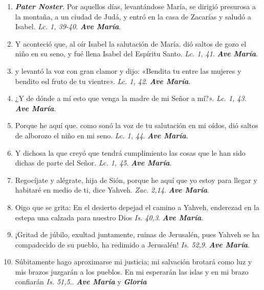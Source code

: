 \documentclass[../../devocionario.tex]{subfiles}
\begin{document}
    \begin{enumerate}
        
        \item \textbf{\emph{Pater Noster}}. Por aquellos días, levantándose María, se dirigió presurosa a la montaña, a un ciudad de Judá, 
            y entró en la casa de Zacarías y saludó a Isabel. \emph{Lc. 1, 39-40}. \textbf{\emph{Ave María}}.

        \item Y aconteció que, al oír Isabel la salutación de María. dió saltos de gozo el niño en su seno, 
            y fué llena Isabel del Espíritu Santo. \emph{Lc. 1, 41}. \textbf{\emph{Ave María}}.

        \item y levantó la voz con gran clamor y dijo: «Bendita tu entre las mujeres y bendito esl fruto de tu vientre». \emph{Lc. 1, 42}. \textbf{\emph{Ave María}}.

        \item ¿Y de dónde a mí esto que venga la madre de mi Señor a mí?». \emph{Lc. 1, 43}. \textbf{\emph{Ave María}}.

        \item Porque he aquí que. como sonó la voz de tu salutación en mi oídos, dió saltos de alborozo el niño en mi seno. \emph{Lc. 1, 44}. \textbf{\emph{Ave María}}.

        \item Y dichosa la que creyó que tendrá cumplimiento las cosas que le han sido dichas de parte del Señor. \emph{Lc. 1, 45}. \textbf{\emph{Ave María}}.

        \item Regocíjate y alégrate, hija de Sión, porque he aquí que yo estoy para llegar y habitaré en medio de ti, dice Yahveh. \emph{Zac. 2,14}. \textbf{\emph{Ave María}}.

        \item Oigo que se grita: En el desierto depejad el camino a Yahveh, enderezad en la estepa una calzada para nuestro Dios \emph{Is. 40,3}. \textbf{\emph{Ave María}}.

        \item ¡Gritad de júbilo, exultad juntamente, ruinas de Jerusalén, pues Yahveh se ha compadecido de su pueblo, 
            ha redimido a Jerusalén! \emph{Is. 52,9}. \textbf{\emph{Ave María}}.

        \item Súbitamente hago aproximarse mi justicia; mi salvación brotará como luz y mis brazos juzgarán a los pueblos. 
            En mi esperarán las islas y en mi brazo confiarán \emph{Is. 51,5}.. \textbf{\emph{Ave María}} y \textbf{\emph{Gloria}}

    \end{enumerate}
\end{document}

